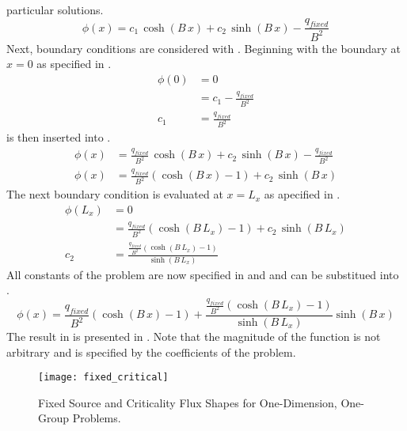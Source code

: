   particular solutions.
  \begin{equation}
    \label{eq:1dfixed_constants}
    \phi(x) = c_1 \, \cosh(B \, x) + c_2 \, \sinh(B \, x) -
      \frac{q_{fixed}}{B^2}
  \end{equation}
  Next, boundary conditions are considered with .
  Beginning with the boundary at $x=0$ as specified in .
  \begin{align}
    \phi(0) &= 0 \\
    &= c_1 - \frac{q_{fixed}}{B^2} \\
    \label{eq:1dfixed_c1}
    c_1 &= \frac{q_{fixed}}{B^2}
  \end{align}
   is then inserted into .
  \begin{align}
    \phi(x) &= \frac{q_{fixed}}{B^2} \, \cosh(B\, x) + c_2 \,
      \sinh(B \, x) - \frac{q_{fixed}}{B^2} \\
    \phi(x) &= \frac{q_{fixed}}{B^2} \left( \cosh(B\, x) -1 \right)
      + c_2 \, \sinh(B \, x)
  \end{align}
  The next boundary condition is evaluated at $x=L_x$ as apecified in
  .
  \begin{align}
    \phi(L_x) &= 0 \\
    &= \frac{q_{fixed}}{B^2} \left( \cosh(B \, L_x ) - 1 \right) + c_2 \,
      \sinh(B \, L_x) \\
    \label{eq:1dfixed_c2}
    c_2 &= \frac{\frac{q_{fixed}}{B^2} \left(\cosh(B \, L_x) -1 \right)}
      {\sinh(B \, L_x)}
  \end{align}
  All constants of the problem are now specified in  and 
   and can be substitued into .
  \begin{equation}
    \label{eq:analytic_1dfixedsrc}
    \phi(x) = \frac{q_{fixed}}{B^2} \left( \cosh(B\,x)-1 \right) +
    \frac{\frac{q_{fixed}}{B^2} \left(\cosh(B\,L_x)-1\right)}{\sinh(B\,L_x)}
    \sinh(B\,x)
  \end{equation}
  The result in  is presented in
  . Note that the magnitude of the function is not
  arbitrary and is specified by the coefficients of the problem.
  \begin{figure}
    \centering
    \texttt{[image: fixed\_critical]}
    \caption{Fixed Source and Criticality Flux Shapes for One-Dimension,
      One-Group Problems.}
    \label{fig:fixed_critical}
  \end{figure}
  
